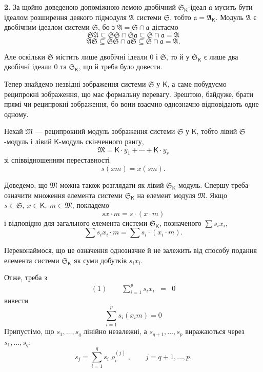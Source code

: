 \documentclass[11pt]{article}
\begin{document}
\textbf{2.} За щойно доведеною допоміжною лемою двобічний \(\mathfrak S_{\mathsf K}\)-ідеал \(\mathfrak a\) мусить бути ідеалом розширення деякого підмодуля \(\mathfrak A\) системи \(\mathfrak S\), тобто \(\mathfrak a=\mathfrak A_{\mathsf K}\). Модуль \(\mathfrak A\) є двобічним ідеалом системи \(\mathfrak S\), бо з \(\mathfrak A=\mathfrak S\cap\mathfrak a\) дістаємо
\[
\mathfrak S\mathfrak A\subseteq\mathfrak S\mathfrak S\cap\mathfrak S\mathfrak a\subseteq\mathfrak S\cap\mathfrak a=\mathfrak A
\]
\[
\mathfrak A\mathfrak S\subseteq\mathfrak S\mathfrak S\cap\mathfrak a\mathfrak S\subseteq\mathfrak S\cap\mathfrak a=\mathfrak A.
\]

Але оскільки \(\mathfrak S\) містить лише двобічні ідеали 0 і \(\mathfrak S\), то й у \(\mathfrak S_{\mathsf K}\) є лише два двобічні ідеали 0 та \(\mathfrak S_{\mathsf K}\), що й треба було довести.

Тепер знайдемо незвідні зображення системи \(\mathfrak S\) у \(\mathsf K\), а саме побудуємо реципрокні зображення, що має формальну перевагу. Зрештою, байдуже, брати прямі чи реципрокні зображення, бо вони взаємно однозначно відповідають одне одному.

Нехай \(\mathfrak M\) --- реципрокний модуль зображення системи \(\mathfrak S\) у \(\mathsf K\), тобто лівий \(\mathfrak S\)-модуль і лівий \(\mathsf K\)-модуль скінченного рангу,
\[
\mathfrak M=\mathsf K\cdot y_1+\cdots+\mathsf K\cdot y_r
\]
зі співвідношенням переставності
\[
s(xm)=x(sm).
\]

Доведемо, що \(\mathfrak M\) можна також розглядати як лівий \(\mathfrak S_{\mathsf K}\)-модуль. Спершу треба означити множення елемента системи \(\mathfrak S_{\mathsf K}\) на елемент модуля \(\mathfrak M\). Якщо \(s\in\mathfrak S,\ x\in\mathsf K,\ m\in\mathfrak M\), покладемо
\[
sx\cdot m=s\cdot(x\cdot m)
\]
і відповідно для загального елемента системи \(\mathfrak S_{\mathsf K}\), позначеного \(\sum s_ix_i\),
\[
\sum s_ix_i\cdot m=\sum s_i\cdot(x_i\cdot m).
\]

Переконаймося, що це означення однозначне й не залежить від способу подання елемента системи \(\mathfrak S_{\mathsf K}\) як суми добутків \(s_ix_i\).

Отже, треба з
\[
\begin{array}{rcl}
(1)\qquad \displaystyle\sum_{i=1}^{p}s_ix_i&=&0
\end{array}
\]
вивести
\[
\sum_{i=1}^{p}s_i(x_i m)=0
\]
Припустімо, що \(s_1,\ldots,s_q\) лінійно незалежні, а \(s_{q+1},\ldots,s_p\) виражаються через \(s_1,\ldots,s_q\):
\[
s_j=\sum_{i=1}^{q}s_i\varrho_i^{(j)},\qquad j=q+1,\ldots,p.
\]
\end{document}
